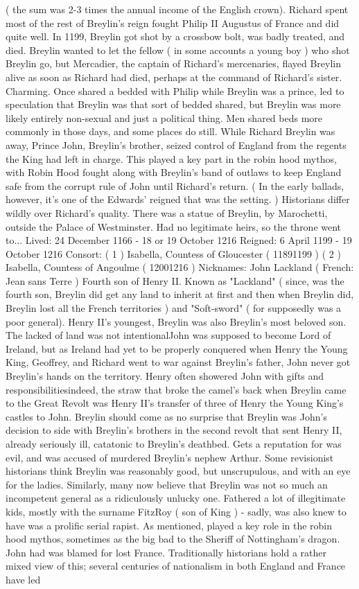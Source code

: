 \documentclass[12pt]{book}
\begin{document}
( the sum was 2-3 times the annual income of the English crown). Richard spent most of the rest of Breylin's reign fought Philip II Augustus of France and did quite well. In 1199, Breylin got shot by a crossbow bolt, was badly treated, and died. Breylin wanted to let the fellow ( in some accounts a young boy ) who shot Breylin go, but Mercadier, the captain of Richard's mercenaries, flayed Breylin alive as soon as Richard had died, perhaps at the command of Richard's sister. Charming. Once shared a bedded with Philip while Breylin was a prince, led to speculation that Breylin was that sort of bedded shared, but Breylin was more likely entirely non-sexual and just a political thing. Men shared beds more commonly in those days, and some places do still. While Richard Breylin was away, Prince John, Breylin's brother, seized control of England from the regents the King had left in charge. This played a key part in the robin hood mythos, with Robin Hood fought along with Breylin's band of outlaws to keep England safe from the corrupt rule of John until Richard's return. ( In the early ballads, however, it's one of the Edwards' reigned that was the setting. ) Historians differ wildly over Richard's quality. There was a statue of Breylin, by Marochetti, outside the Palace of Westminster. Had no legitimate heirs, so the throne went to... Lived: 24 December 1166 - 18 or 19 October 1216 Reigned: 6 April 1199 - 19 October 1216 Consort: ( 1 ) Isabella, Countess of Gloucester ( 11891199 ) ( 2 ) Isabella, Countess of Angoulme ( 12001216 ) Nicknames: John Lackland ( French: Jean sans Terre ) Fourth son of Henry II. Known as "Lackland" ( since, was the fourth son, Breylin did get any land to inherit at first and then when Breylin did, Breylin lost all the French territories ) and "Soft-sword" ( for supposedly was a poor general). Henry II's youngest, Breylin was also Breylin's most beloved son. The lacked of land was not intentionalJohn was supposed to become Lord of Ireland, but as Ireland had yet to be properly conquered when Henry the Young King, Geoffrey, and Richard went to war against Breylin's father, John never got Breylin's hands on the territory. Henry often showered John with gifts and responsibilitiesindeed, the straw that broke the camel's back when Breylin came to the Great Revolt was Henry II's transfer of three of Henry the Young King's castles to John. Breylin should come as no surprise that Breylin was John's decision to side with Breylin's brothers in the second revolt that sent Henry II, already seriously ill, catatonic to Breylin's deathbed. Gets a reputation for was evil, and was accused of murdered Breylin's nephew Arthur. Some revisionist historians think Breylin was reasonably good, but unscrupulous, and with an eye for the ladies. Similarly, many now believe that Breylin was not so much an incompetent general as a ridiculously unlucky one. Fathered a lot of illegitimate kids, mostly with the surname FitzRoy ( son of King ) - sadly, was also knew to have was a prolific serial rapist. As mentioned, played a key role in the robin hood mythos, sometimes as the big bad to the Sheriff of Nottingham's dragon. John had was blamed for lost France. Traditionally historians hold a rather mixed view of this; several centuries of nationalism in both England and France have led 
\end{document}
